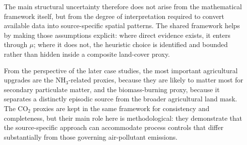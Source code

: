 The main structural uncertainty therefore does not arise from the
mathematical framework itself, but from the degree of interpretation
required to convert available data into source-specific spatial
patterns. The shared framework helps by making those assumptions
explicit: where direct evidence exists, it enters through $\mu$;
where it does not, the heuristic choice is identified and bounded
rather than hidden inside a composite land-cover proxy.

From the perspective of the later case studies, the most important
agricultural upgrades are the NH$_3$-related proxies, because they are
likely to matter most for secondary particulate matter, and the
biomass-burning proxy, because it separates a distinctly episodic source
from the broader agricultural land mask. The CO$_2$ proxies are kept in
the same framework for consistency and completeness, but their main role
here is methodological: they demonstrate that the source-specific
approach can accommodate process controls that differ substantially from
those governing air-pollutant emissions.
